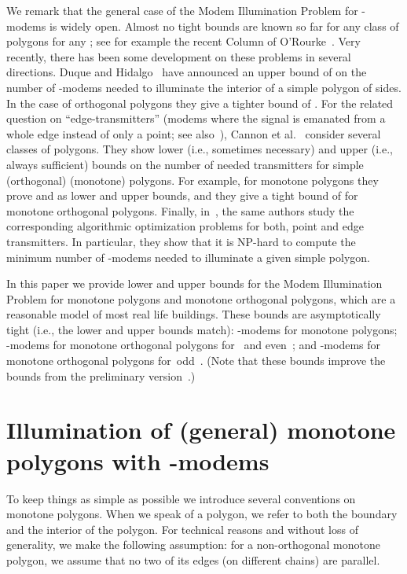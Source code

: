 \documentclass[A4]{article}
\begin{document}
We remark that the general case of the Modem Illumination Problem for \mbox{-modems} is widely open.
Almost no tight bounds are known so far for any class of polygons for any ; 
see for example the recent Column of O'Rourke~\cite{ORourke2}.
Very recently, there has been some development on these problems in several directions.
Duque and Hidalgo~\cite{DH} have announced
an upper bound of  on the number of  \mbox{-modems}
needed to illuminate the interior of a simple polygon of  sides.
In the case of orthogonal polygons they give a tighter bound of .
For the related question on ``edge-transmitters'' (modems where the signal is emanated from a whole edge instead of only a point; see also~\cite{Shermer}), Cannon et al.~\cite{edgetrans} consider several classes of polygons.
They show lower (i.e., sometimes necessary) and upper (i.e., always sufficient) bounds on the number of needed transmitters for simple (orthogonal) (monotone) polygons.
For example, for monotone polygons they prove  and  as lower and upper bounds, and they give a tight bound of  for monotone orthogonal polygons.
Finally, in~\cite{np}, the same authors study the corresponding algorithmic optimization problems for both, point and edge transmitters.
In particular, they show that it is NP-hard to compute the minimum number of \mbox{-modems} needed to illuminate a given simple polygon. 



In this paper we provide lower and upper bounds for the Modem Illumination Problem for monotone polygons and monotone orthogonal polygons, which are a reasonable model of most real life buildings.
These bounds are asymptotically tight (i.e., the lower and upper bounds match):
 \mbox{-modems} for monotone polygons;
 \mbox{-modems} for monotone orthogonal polygons for~ and even~;
and  \mbox{-modems} for monotone orthogonal polygons for~odd~.
(Note that these bounds improve the bounds from the preliminary version~\cite{Aich}.)

\section{Illumination of (general) monotone polygons with -modems}
\label{sec:gmono}

To keep things as simple as possible we introduce several conventions on monotone polygons.
When we speak of a polygon, we refer to both the boundary and the interior of the polygon.
For technical reasons and without loss of generality, we make the following assumption: for a non-ortho\-gonal monotone polygon, we assume that no two of its edges (on different chains) are parallel. 
\end{document}
